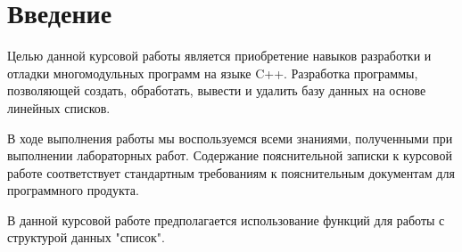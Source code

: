 \section*{Введение}

Целью данной курсовой работы является приобретение навыков разработки и отладки многомодульных
программ на языке C++. Разработка программы, позволяющей создать,
обработать, вывести и удалить базу данных на основе линейных списков.

В ходе выполнения работы мы воспользуемся всеми знаниями, полученными при выполнении лабораторных работ.
Содержание пояснительной записки к курсовой работе соответствует стандартным требованиям к пояснительным документам для программного продукта.

В данной курсовой работе предполагается использование функций для
работы с структурой данных "список".
